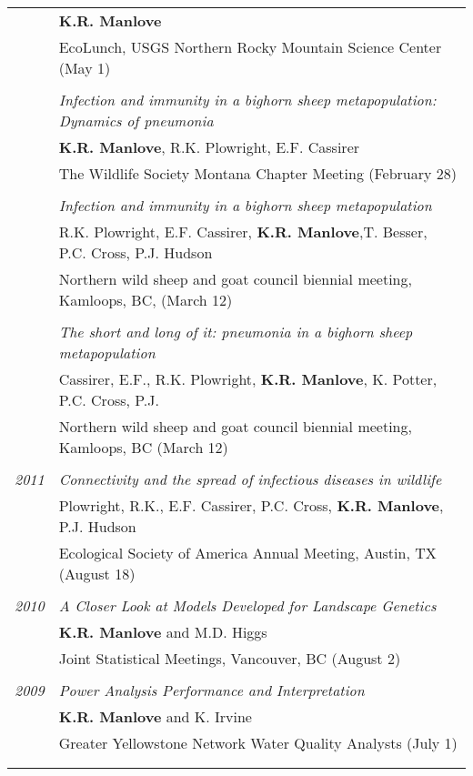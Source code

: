 \documentclass[9pt]{article}
\begin{document}
\begin{tabular}{p{.5cm} p{15cm}}
& \textbf{K.R. Manlove}\\
& EcoLunch, USGS Northern Rocky Mountain Science Center (May 1)\\
\\
& \hspace{-.5cm}\textit{Infection and immunity in a bighorn sheep metapopulation: Dynamics of pneumonia }\\
& \textbf{K.R. Manlove}, R.K. Plowright, E.F. Cassirer\\
& The Wildlife Society Montana Chapter Meeting (February 28)\\
\\
& \hspace{-.5cm}\textit{Infection and immunity in a bighorn sheep metapopulation}\\
& R.K. Plowright, E.F. Cassirer, \textbf{K.R. Manlove},T. Besser, P.C. Cross, P.J. Hudson\\
& Northern wild sheep and goat council biennial meeting, Kamloops, BC, (March 12)\\
\\
& \hspace{-.5cm}\textit{The short and long of it: pneumonia in a bighorn sheep metapopulation}\\
& Cassirer, E.F., R.K. Plowright, \textbf{K.R. Manlove}, K. Potter, P.C. Cross, P.J. \\
& Northern wild sheep and goat council biennial meeting, Kamloops, BC (March 12)\\
\\
\hspace{-1.75cm} \footnotesize{\textit{2011}} & \hspace{-.5cm}\textit{Connectivity and the spread of infectious diseases in wildlife}\\
& Plowright, R.K., E.F. Cassirer, P.C. Cross, \textbf{K.R. Manlove}, P.J. Hudson\\
& Ecological Society of America Annual Meeting, Austin, TX (August 18)\\
\\
\hspace{-1.75cm} \footnotesize{\textit{2010}} & \hspace{-.5cm}\textit{A Closer Look at Models Developed for Landscape Genetics}\\
& \textbf{K.R. Manlove} and M.D. Higgs\\
& Joint Statistical Meetings, Vancouver, BC (August 2)\\
\\
\hspace{-1.75cm} \footnotesize{\textit{2009}} & \hspace{-.5cm}\textit{Power Analysis Performance and Interpretation}\\
& \textbf{K.R. Manlove} and K. Irvine\\
& Greater Yellowstone Network Water Quality Analysts (July 1) \\
\\
\\
\end{tabular}
\end{document}
